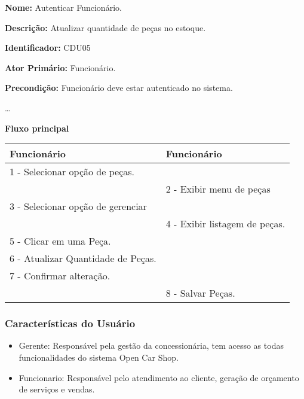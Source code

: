 	\par
	\textbf{Nome:} Autenticar Funcionário.
	\par
	\textbf{Descrição:}  Atualizar quantidade de peças no estoque.	
	\par 
	\textbf{Identificador:} CDU05
	\par
	\textbf{Ator Primário:} Funcionário.	
	\par
	\textbf{Precondição:} Funcionário deve estar autenticado no sistema.
	\par
	\ldots
	\par
	\textbf{Fluxo principal}\par
	\begin{tabular}{|p{7cm}|p{7cm}|}
		\hline 
		
		
		Funcionário
		& 
		
		Funcionário
		\\ 
		\hline 
		
		
		1 - Selecionar opção de peças.
		&  \\ 
		\hline 
		& 
		
		2 - Exibir menu de peças
		\\ 
		\hline 
		
		
		3 - Selecionar opção de gerenciar
		&  \\ 
		\hline 
		& 
		
		4 - Exibir listagem de peças.
		\\ 
		\hline 
		
		
		5 - Clicar em uma Peça.
		&  \\ 
		\hline 
		
		
		6 - Atualizar Quantidade de Peças.
		&  \\ 
		\hline 
		
		
		7 - Confirmar alteração.
		&  \\ 
		\hline 
		& 
		
		8 - Salvar Peças.
		\\ 
		\hline 
	\end{tabular} 
	\vspace{12px}	
	
	\subsubsection{Características do Usuário}
	
	\begin{itemize}
	\item[] Gerente: Responsável pela gestão da concessionária, tem acesso as todas   funcionalidades  do sistema Open Car Shop.
	\item[] Funcionario: Responsável pelo atendimento ao cliente, geração de orçamento de serviços e vendas.
	\end{itemize}

